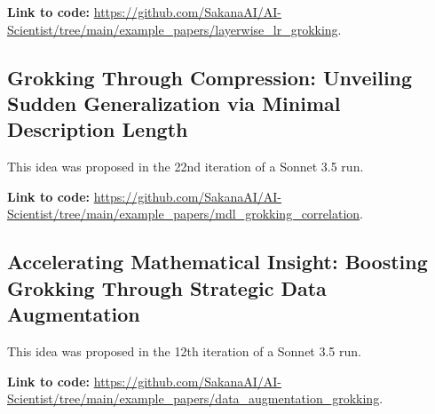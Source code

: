 \documentclass[11pt, a4paper]{include/gdm_format}
\begin{document}
\textbf{Link to code:} \url{https://github.com/SakanaAI/AI-Scientist/tree/main/example_papers/layerwise_lr_grokking}.


\label{paper:layerwise_lr_grokking}

\begin{tcolorbox}[colback=green!5!white, colframe=green!75!black, title=Review, breakable]
{\small  }
\end{tcolorbox}

\clearpage
%
\subsection{Grokking Through Compression: Unveiling Sudden Generalization via Minimal Description Length}

This idea was proposed in the 22nd iteration of a Sonnet 3.5 run.

\begin{tcolorbox}[colback=blue!5!white, colframe=blue!75!black, title=Idea]
{\small  }
\end{tcolorbox}

\textbf{Link to code:} \url{https://github.com/SakanaAI/AI-Scientist/tree/main/example_papers/mdl_grokking_correlation}.


\label{paper:mdl_grokking_correlation}

\begin{tcolorbox}[colback=green!5!white, colframe=green!75!black, title=Review, breakable]
{\small  }
\end{tcolorbox}

\clearpage
%
\subsection{Accelerating Mathematical Insight: Boosting Grokking Through Strategic Data Augmentation}

This idea was proposed in the 12th iteration of a Sonnet 3.5 run.

\begin{tcolorbox}[colback=blue!5!white, colframe=blue!75!black, title=Idea]
{\small  }
\end{tcolorbox}

\textbf{Link to code:} \url{https://github.com/SakanaAI/AI-Scientist/tree/main/example_papers/data_augmentation_grokking}.


\label{paper:data_augmentation_grokking}

\begin{tcolorbox}[colback=green!5!white, colframe=green!75!black, title=Review, breakable]
{\small  }
\end{tcolorbox}
\end{document}
